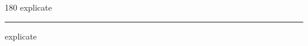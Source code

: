 
\begin{frame}
\begin{center}
\begin{turn}{180}
{\fontsize{2.5cm}{1em}\selectfont explicate}
\end{turn}
\vspace{1em}\par  
\hrule
\vspace{1em}\par  
{\fontsize{2.5cm}{1em}\selectfont explicate}
\end{center}
\end{frame}
